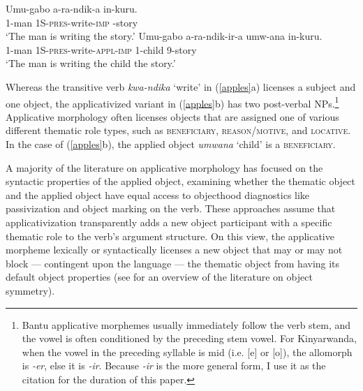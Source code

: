 \documentclass[output=paper]{langsci/langscibook}
\begin{document}
\begin{exe}
\ex\label{apples}
	\begin{xlist}
          \ex\gll Umu-gabo a-ra-ndik-a in-kuru.\\
          {\scshape 1}-man {\scshape 1S-pres}-write-{\scshape imp} {-}story\\
          \glt `The man is writing the story.'
          \ex\gll Umu-gabo a-ra-ndik-ir-a umw-ana in-kuru.\\
          {\scshape 1}-man {\scshape 1S-pres}-write-{\scshape appl-imp} {\scshape 1-}child {\scshape 9-}story\\
          \glt `The man is writing the child the story.'
	\end{xlist}
\end{exe} 
%
Whereas the transitive verb \emph{kwa-ndika} `write' in (\ref{apples}a) licenses a subject and one object, the applicativized variant in (\ref{apples}b) has two post-verbal NPs.\footnote{Bantu applicative morphemes usually immediately follow  the verb stem, and the vowel is often conditioned by the preceding stem vowel. For Kinyarwanda, when the vowel in the preceding syllable is mid (i.e. [e] or [o]), the allomorph is \emph{-er}, else it is \emph{-ir}. Because \emph{-ir} is the more general form, I use it as the citation for the duration of this paper.}  Applicative morphology often licenses objects that are assigned one of various different thematic role types, such as {\scshape beneficiary, reason/motive,} and {\scshape locative}. In the case of (\ref{apples}b), the applied object  \emph{umwana} `child' is a {\scshape beneficiary}.

 A majority of the literature on applicative morphology has focused on the syntactic properties of the applied object, examining whether the thematic object and the applied object have equal access to objecthood diagnostics like passivization and object marking on the verb. These approaches assume that applicativization transparently adds a new object participant with a specific thematic role to the verb's argument structure.  On this view, the applicative morpheme lexically or syntactically licenses a new object that may or may not block --- contingent upon the language ---  the thematic object from having its default object properties (see  for an overview of the literature on object symmetry).
\end{document}
